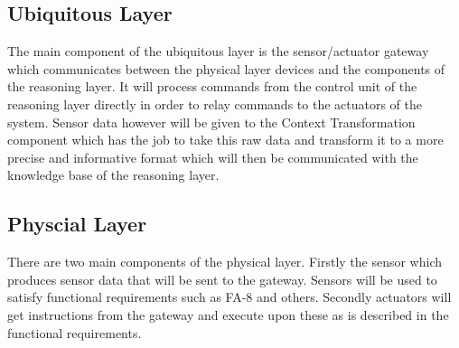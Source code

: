 \documentclass[runningheads]{llncs}
\begin{document}
    \subsection{Ubiquitous Layer}
    The main component of the ubiquitous layer is the sensor/actuator gateway which communicates between the physical layer devices and the components of the reasoning layer. It will process commands from the control unit of the reasoning layer directly in order to relay commands to the actuators of the system. Sensor data however will be given to the Context Transformation component which has the job to take this raw data and transform it to a more precise and informative format which will then be communicated with the knowledge base of the reasoning layer.

    \subsection{Physcial Layer}
    There are two main components of the physical layer. Firstly the sensor which produces sensor data that will be sent to the gateway. Sensors will be used to satisfy functional requirements such as FA-8 and others. Secondly actuators will get instructions from the gateway and execute upon these as is described in the functional requirements.



%
%
%
%

\end{document}
